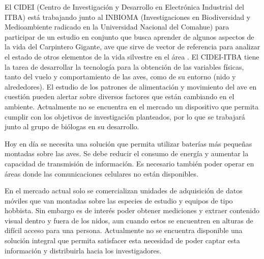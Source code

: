 El CIDEI (Centro de Investigación y Desarrollo en Electrónica Industrial del ITBA) está trabajando junto al INBIOMA (Investigaciones en Biodiversidad y Medioambiente radicado en la Universidad Nacional del Comahue) para participar de un estudio en conjunto que busca aprender de algunos aspectos de la vida del Carpintero Gigante, ave que sirve de vector de referencia para analizar el estado de otros elementos de la vida silvestre en el área \cite{ref:PaperValeriaOjeda}. El CIDEI-ITBA tiene la tarea de desarrollar la tecnología para la obtención de las variables físicas, tanto del vuelo y comportamiento de las aves, como de su entorno (nido y alrededores). El estudio de los patrones de alimentación y movimiento del ave en cuestión pueden alertar sobre diversos factores que están cambiando en el ambiente. Actualmente no se encuentra en el mercado un dispositivo que permita cumplir con los objetivos de investigación planteados, por lo que se trabajará junto al grupo de biólogas en su desarrollo.

Hoy en día se necesita una solución que permita utilizar baterías más pequeñas montadas sobre las aves. Se debe reducir el consumo de energía y aumentar la capacidad de transmisión de información. Es necesario también poder operar en áreas donde las comunicaciones celulares no están disponibles.

En el mercado actual solo se comercializan unidades de adquisición de datos móviles que van montadas sobre las especies de estudio y equipos de tipo hobbista. Sin embargo es de interés poder obtener mediciones y extraer contenido visual dentro y fuera de los nidos, aun cuando estos se encuentren en alturas de difícil acceso para una persona. Actualmente no se encuentra disponible una solución integral que permita satisfacer esta necesidad de poder captar esta información y distribuirla hacia los investigadores.

%
